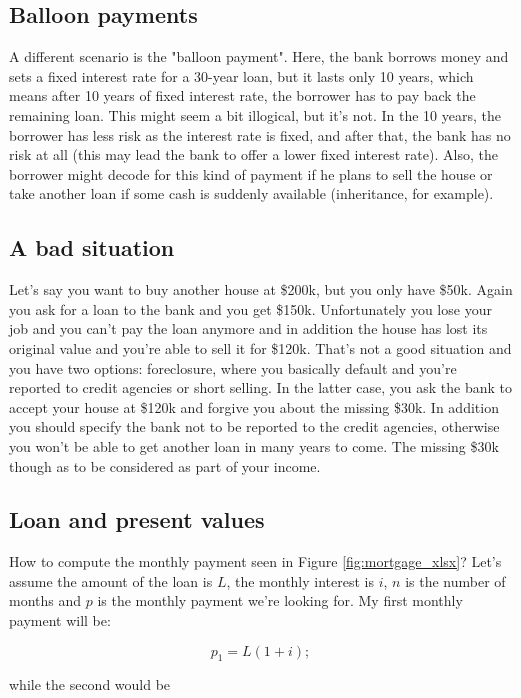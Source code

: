 \subsection{Balloon payments}
A different scenario is the "balloon payment". Here, the bank borrows money and sets a fixed interest rate for a 30-year loan, but it lasts only 10 years, which means after 10 years of fixed interest rate, the borrower has to pay back the remaining loan. This might seem a bit illogical, but it's not. In the 10 years, the borrower has less risk as the interest rate is fixed, and after that, the bank has no risk at all (this may lead the bank to offer a lower fixed interest rate). Also, the borrower might decode for this kind of payment if he plans to sell the house or take another loan if some cash is suddenly available (inheritance, for example).

\subsection{A bad situation}
Let's say you want to buy another house at \$200k, but you only have \$50k. Again you ask for a loan to the bank and you get \$150k. Unfortunately you lose your job and you can't pay the loan anymore and in addition the house has lost its original value and you're able to sell it for \$120k. That's not a good situation and you have two options: foreclosure, where you basically default and you're reported to credit agencies or short selling. In the latter case, you ask the bank to accept your house at \$120k and forgive you about the missing \$30k. In addition you should specify the bank not to be reported to the credit agencies, otherwise you won't be able to get another loan in many years to come. The missing \$30k though as to be considered as part of your income.

\subsection{Loan and present values}
How to compute the monthly payment seen in Figure \ref{fig:mortgage_xlsx}? Let's assume the amount of the loan is $L$, the monthly interest is $i$, $n$ is the number of months and $p$ is the monthly payment we're looking for. My first monthly payment will be:

\begin{equation}\label{eq:1monthly_payment}
p_1 = L(1+i) ;
\end{equation}

while the second would be 

